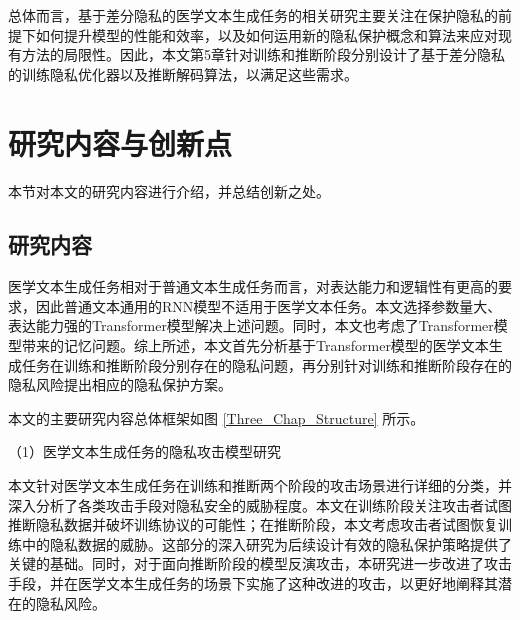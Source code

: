
总体而言，基于差分隐私的医学文本生成任务的相关研究主要关注在保护隐私的前提下如何提升模型的性能和效率，以及如何运用新的隐私保护概念和算法来应对现有方法的局限性。因此，本文第5章针对训练和推断阶段分别设计了基于差分隐私的训练隐私优化器以及推断解码算法，以满足这些需求。


\section{研究内容与创新点}

本节对本文的研究内容进行介绍，并总结创新之处。

\subsection{研究内容}

医学文本生成任务相对于普通文本生成任务而言，对表达能力和逻辑性有更高的要求，因此普通文本通用的RNN模型不适用于医学文本任务。本文选择参数量大、表达能力强的Transformer模型解决上述问题。同时，本文也考虑了Transformer模型带来的记忆问题。综上所述，本文首先分析基于Transformer模型的医学文本生成任务在训练和推断阶段分别存在的隐私问题，再分别针对训练和推断阶段存在的隐私风险提出相应的隐私保护方案。

本文的主要研究内容总体框架如图 \ref{Three_Chap_Structure} 所示。



（1）医学文本生成任务的隐私攻击模型研究

本文针对医学文本生成任务在训练和推断两个阶段的攻击场景进行详细的分类，并深入分析了各类攻击手段对隐私安全的威胁程度。本文在训练阶段关注攻击者试图推断隐私数据并破坏训练协议的可能性；在推断阶段，本文考虑攻击者试图恢复训练中的隐私数据的威胁。这部分的深入研究为后续设计有效的隐私保护策略提供了关键的基础。同时，对于面向推断阶段的模型反演攻击，本研究进一步改进了攻击手段，并在医学文本生成任务的场景下实施了这种改进的攻击，以更好地阐释其潜在的隐私风险。


